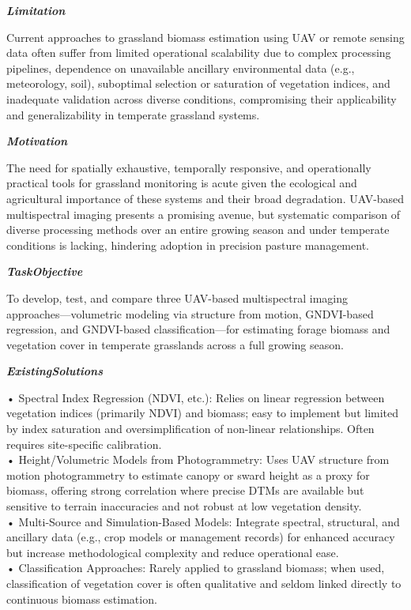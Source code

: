 \begin{tcolorbox}[
    breakable,
    title={Example of Idea Generation in Earth},
    colback=LighterGray,
    colframe=DeepPurple,
    colbacktitle=DeepPurple,
    coltitle=White,
]
\textbf{\emph{\textcolor{CaseOrange}{Limitation}}}

Current approaches to grassland biomass estimation using UAV or remote sensing data often suffer
from limited operational scalability due to complex processing pipelines, dependence on unavailable
ancillary environmental data (e.g., meteorology, soil), suboptimal selection or saturation of
vegetation indices, and inadequate validation across diverse conditions, compromising their
applicability and generalizability in temperate grassland systems.

\textbf{\emph{\textcolor{CaseOrange}{Motivation}}}

The need for spatially exhaustive, temporally responsive, and operationally practical tools for
grassland monitoring is acute given the ecological and agricultural importance of these systems and
their broad degradation. UAV-based multispectral imaging presents a promising avenue, but systematic
comparison of diverse processing methods over an entire growing season and under temperate
conditions is lacking, hindering adoption in precision pasture management.

\textbf{\emph{\textcolor{CaseOrange}{TaskObjective}}}

To develop, test, and compare three UAV-based multispectral imaging approaches—volumetric modeling
via structure from motion, GNDVI-based regression, and GNDVI-based classification—for estimating
forage biomass and vegetation cover in temperate grasslands across a full growing season.

\textbf{\emph{\textcolor{CaseOrange}{ExistingSolutions}}}

• Spectral Index Regression (NDVI, etc.): Relies on linear regression between vegetation indices (primarily NDVI) and biomass; easy to implement but limited by index saturation and oversimplification of non-linear relationships. Often requires site-specific calibration. \\
• Height/Volumetric Models from Photogrammetry: Uses UAV structure from motion photogrammetry to estimate canopy or sward height as a proxy for biomass, offering strong correlation where precise DTMs are available but sensitive to terrain inaccuracies and not robust at low vegetation density. \\
• Multi-Source and Simulation-Based Models: Integrate spectral, structural, and ancillary data (e.g., crop models or management records) for enhanced accuracy but increase methodological complexity and reduce operational ease. \\
• Classification Approaches: Rarely applied to grassland biomass; when used, classification of vegetation cover is often qualitative and seldom linked directly to continuous biomass estimation. 


\end{tcolorbox}
